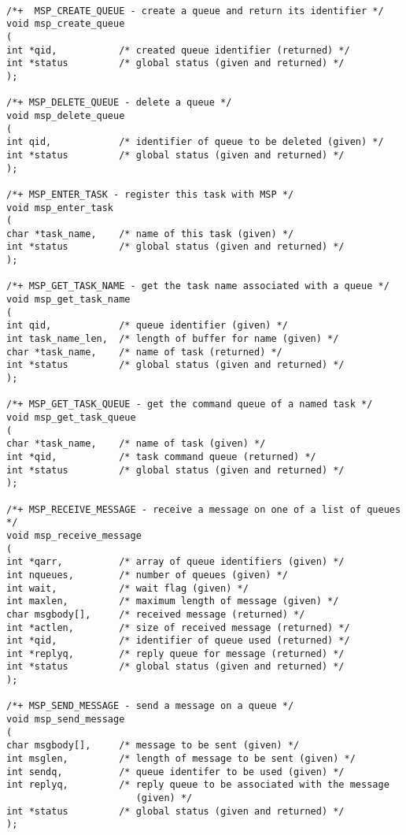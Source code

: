 \begin{verbatim}

/*+  MSP_CREATE_QUEUE - create a queue and return its identifier */
void msp_create_queue
(
int *qid,           /* created queue identifier (returned) */
int *status         /* global status (given and returned) */
);

/*+ MSP_DELETE_QUEUE - delete a queue */
void msp_delete_queue
(
int qid,            /* identifier of queue to be deleted (given) */
int *status         /* global status (given and returned) */
);

/*+ MSP_ENTER_TASK - register this task with MSP */
void msp_enter_task
(
char *task_name,    /* name of this task (given) */
int *status         /* global status (given and returned) */
);

/*+ MSP_GET_TASK_NAME - get the task name associated with a queue */
void msp_get_task_name
(
int qid,            /* queue identifier (given) */
int task_name_len,  /* length of buffer for name (given) */
char *task_name,    /* name of task (returned) */
int *status         /* global status (given and returned) */
);

/*+ MSP_GET_TASK_QUEUE - get the command queue of a named task */
void msp_get_task_queue
(
char *task_name,    /* name of task (given) */
int *qid,           /* task command queue (returned) */
int *status         /* global status (given and returned) */
);

/*+ MSP_RECEIVE_MESSAGE - receive a message on one of a list of queues */
void msp_receive_message
(
int *qarr,          /* array of queue identifiers (given) */
int nqueues,        /* number of queues (given) */
int wait,           /* wait flag (given) */
int maxlen,         /* maximum length of message (given) */
char msgbody[],     /* received message (returned) */
int *actlen,        /* size of received message (returned) */
int *qid,           /* identifier of queue used (returned) */
int *replyq,        /* reply queue for message (returned) */
int *status         /* global status (given and returned) */
);

/*+ MSP_SEND_MESSAGE - send a message on a queue */
void msp_send_message
(
char msgbody[],     /* message to be sent (given) */
int msglen,         /* length of message to be sent (given) */
int sendq,          /* queue identifer to be used (given) */
int replyq,         /* reply queue to be associated with the message 
                       (given) */
int *status         /* global status (given and returned) */
);

\end{verbatim}


